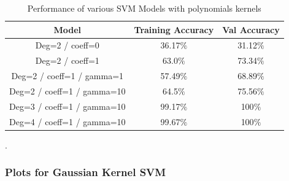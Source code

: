 \newpage
{
\begin{table}[!h]
\centering
\begin{tabular}{ |c|c|c|  }
\hline
\rowcolor{lightgray} Model & Training Accuracy & Val Accuracy\\
\hline
Deg=2 / coeff=0 & 36.17$\%$  & 31.12$\%$  \\ 
\hline
Deg=2 / coeff=1 & 63.0$\%$  & 73.34$\%$  \\ 
\hline
Deg=2 / coeff=1 / gamma=1 & 57.49$\%$  & 68.89$\%$  \\ 
\hline
Deg=2 / coeff=1 / gamma=10 & 64.5$\%$  & 75.56$\%$  \\ 
\hline
Deg=3 / coeff=1 / gamma=10 & 99.17$\%$  & 100$\%$  \\ 
\hline
Deg=4 / coeff=1 / gamma=10 & 99.67$\%$  & 100$\%$  \\ 
\hline
\end{tabular}
\caption{Performance of various SVM Models with polynomials kernels}.
\label{table:3}
\end{table}
}

\subsubsection{Plots for Gaussian Kernel SVM}


